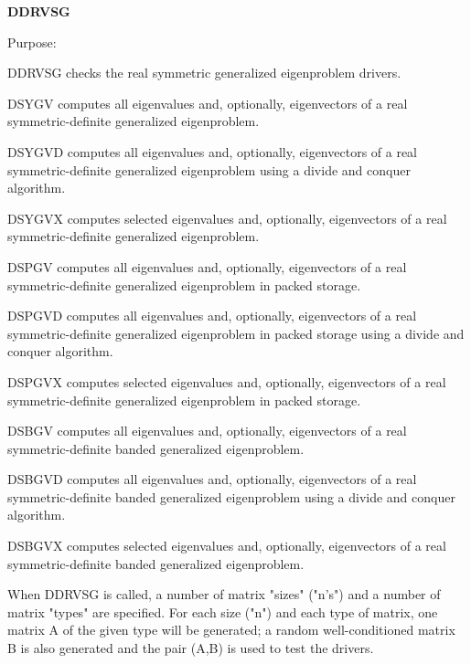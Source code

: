 {\bfseries D\+D\+R\+V\+S\+G} 

\begin{DoxyParagraph}{Purpose\+: }
\begin{DoxyVerb}      DDRVSG checks the real symmetric generalized eigenproblem
      drivers.

              DSYGV computes all eigenvalues and, optionally,
              eigenvectors of a real symmetric-definite generalized
              eigenproblem.

              DSYGVD computes all eigenvalues and, optionally,
              eigenvectors of a real symmetric-definite generalized
              eigenproblem using a divide and conquer algorithm.

              DSYGVX computes selected eigenvalues and, optionally,
              eigenvectors of a real symmetric-definite generalized
              eigenproblem.

              DSPGV computes all eigenvalues and, optionally,
              eigenvectors of a real symmetric-definite generalized
              eigenproblem in packed storage.

              DSPGVD computes all eigenvalues and, optionally,
              eigenvectors of a real symmetric-definite generalized
              eigenproblem in packed storage using a divide and
              conquer algorithm.

              DSPGVX computes selected eigenvalues and, optionally,
              eigenvectors of a real symmetric-definite generalized
              eigenproblem in packed storage.

              DSBGV computes all eigenvalues and, optionally,
              eigenvectors of a real symmetric-definite banded
              generalized eigenproblem.

              DSBGVD computes all eigenvalues and, optionally,
              eigenvectors of a real symmetric-definite banded
              generalized eigenproblem using a divide and conquer
              algorithm.

              DSBGVX computes selected eigenvalues and, optionally,
              eigenvectors of a real symmetric-definite banded
              generalized eigenproblem.

      When DDRVSG is called, a number of matrix "sizes" ("n's") and a
      number of matrix "types" are specified.  For each size ("n")
      and each type of matrix, one matrix A of the given type will be
      generated; a random well-conditioned matrix B is also generated
      and the pair (A,B) is used to test the drivers.


\end{DoxyVerb}
\end{DoxyParagraph}
